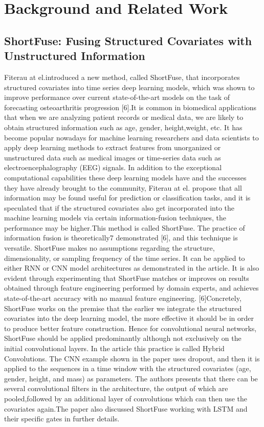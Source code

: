 \documentclass[12pt]{article}
\begin{document}
\section{Background and Related Work}

\subsection{ShortFuse: Fusing Structured Covariates with  Unstructured Information}

Fiterau at el.introduced  a  new  method,  called  ShortFuse,  that  incorporates  structured covariates into time series deep learning models, which was shown to improve performance over current state-of-the-art models on the task of forecasting osteoarthritis progression [6].It is common in biomedical applications that when we are analyzing patient records or medical data,  we are likely to obtain structured information such as age,  gender,  height,weight, etc.  It has become popular nowadays for machine learning researchers and data scientists to apply deep learning methods to extract features from unorganized or unstructured data such as medical images or time-series data such as electroencephalography (EEG) signals.  In addition to the exceptional computational capabilities these deep learning models have and the successes they have already brought to the community, Fiterau at el. propose that  all  information  may  be  found  useful  for  prediction  or  classification  tasks,  and  it  is speculated that if the structured covariates also get incorporated into the machine learning models via certain information-fusion techniques, the performance may be higher.This  method  is  called  ShortFuse.   The  practice  of  information  fusion  is  theoretically7
demonstrated [6], and this technique is versatile.  ShortFuse makes no assumptions regarding the structure, dimensionality, or sampling frequency of the time series.  It can be applied to either RNN or CNN model architectures as demonstrated in the article.  It is also evident through  experimenting  that  ShortFuse  matches  or  improves  on  results  obtained  through feature  engineering  performed  by  domain  experts,  and  achieves  state-of-the-art  accuracy with no manual feature engineering.  [6]Concretely, ShortFuse works on the premise that the earlier we integrate the structured covariates into the deep learning model, the more effective it should be in order to produce better feature construction.  Hence for convolutional neural networks, ShortFuse should be applied predominantly although not exclusively on the initial convolutional layers.  In the article this practice is called Hybrid Convolutions.  The CNN example shown in the paper uses dropout, and then it is applied to the sequences in a time window with the structured covariates (age, gender, height, and mass) as parameters.  The authors presents that there can  be  several  convolutional  filters  in  the  architecture,  the  output  of  which  are  pooled,followed  by  an  additional  layer  of  convolutions  which  can  then  use  the  covariates  again.The paper also discussed ShortFuse working with LSTM and their specific gates in further details.
\end{document}

